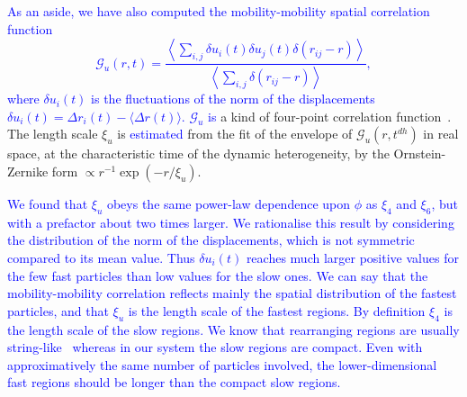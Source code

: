 \documentclass[prl,twocolumn,notitlepage]{revtex4-1}
\begin{document}
\textcolor{blue}{As an aside, we have also computed the mobility-mobility spatial correlation function~\cite{Donati1999}
\begin{equation}
	\mathcal{G}_u(r,t) = \frac{
		\left\langle \sum_{i,j}{\delta u_i(t) \delta u_j(t) \delta(r_{ij} -r)} \right\rangle 
	}{
		\left\langle \sum_{i,j}{\delta(r_{ij} -r)} \right\rangle
	},
	\label{eq:mobility_correl}
\end{equation}
where $\delta u_i(t)$ is the fluctuations of the norm of the displacements $\delta u_i(t) = \Delta r_i(t)-\langle\Delta r(t)\rangle$. $\mathcal{G}_u$ is} a kind of four-point correlation function~\cite{cavagna2009supercooled}. The length scale $\xi_u$ is \textcolor{blue}{estimated} from the fit of the envelope of $\mathcal{G}_u(r,t^{dh})$ in real space, at the characteristic time of the dynamic heterogeneity, by the Ornstein-Zernike form $\propto r^{-1}\exp( -r/\xi_u)$. 

\textcolor{blue}{We found that $\xi_u$ obeys the same power-law dependence upon $\phi$ as $\xi_4$ and $\xi_6$, but with a prefactor about two times larger. We rationalise this result by considering the distribution of the norm of the displacements, which is not symmetric compared to its mean value. Thus $\delta u_i(t)$ reaches much larger positive values for the few fast particles than low values for the slow ones. We can say that the mobility-mobility correlation reflects mainly the spatial distribution of the fastest particles, and that $\xi_u$ is the length scale of the fastest regions. By definition $\xi_4$ is the length scale of the slow regions. We know that rearranging regions are usually string-like~\cite{Donati1999} whereas in our system the slow regions are compact. Even with approximatively the same number of particles involved, the lower-dimensional fast regions should be longer than the compact slow regions.}



%

\end{document}
